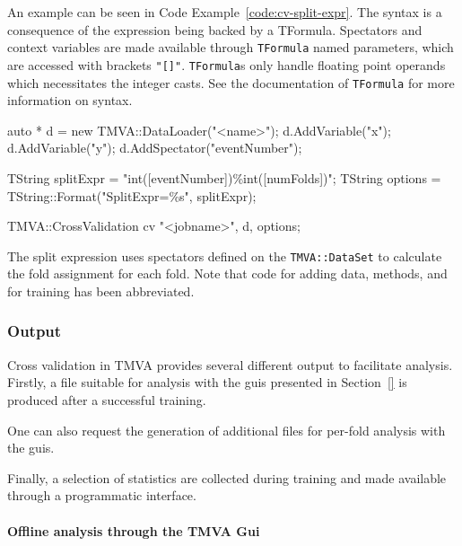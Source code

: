 An example can be seen in Code Example~\ref{code:cv-split-expr}. The syntax is a consequence of the expression being backed by a TFormula. Spectators and context variables are made available through \texttt{TFormula} named parameters, which are accessed with brackets \texttt{"[]"}. \texttt{TFormula}s only handle floating point operands which necessitates the integer casts. See the documentation of \texttt{TFormula} for more information on syntax.

\begin{codeexample}
\begin{tmvacode}
auto * d = new TMVA::DataLoader("<name>");
d.AddVariable("x");
d.AddVariable("y");
d.AddSpectator("eventNumber");

TString splitExpr = "int([eventNumber])\%int([numFolds])";
TString options = TString::Format("SplitExpr=\%s", splitExpr);

TMVA::CrossValidation cv {"<jobname>", d, options};
\end{tmvacode}
\caption[.]{\codeexampleCaptionSize The split expression uses spectators defined on the \texttt{TMVA::DataSet} to calculate the fold assignment for each fold. Note that code for adding data, methods, and for training has been abbreviated.
}
\label{code:cv-split-expr}
\end{codeexample}










\subsubsection{Output}
\label{sec:cv-output}

Cross validation in TMVA provides several different output to facilitate analysis. Firstly, a file suitable for analysis with the guis presented in Section~\ref{} is produced after a successful training.

One can also request the generation of additional files for per-fold analysis with the guis.

Finally, a selection of statistics are collected during training and made available through a programmatic interface.

\paragraph{Offline analysis through the TMVA Gui}
\label{sec:cv-output-files}

